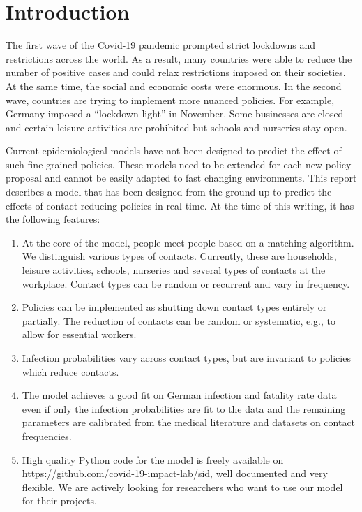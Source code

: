\section{Introduction}
\label{sec:introduction}


The first wave of the Covid-19 pandemic prompted strict lockdowns and restrictions across the world. As a result, many countries were able to reduce the number of positive cases and could relax restrictions imposed on their societies. At the same time, the social and economic costs were enormous. In the second wave, countries are trying to implement more nuanced policies. For example, Germany imposed a ``lockdown-light'' in November. Some businesses are closed and certain leisure activities are prohibited but schools and nurseries stay open.

Current epidemiological models have not been designed to predict the effect of such fine-grained policies. These models need to be extended for each new policy proposal and cannot be easily adapted to fast changing environments. This report describes a model that has been designed from the ground up to predict the effects of contact reducing policies in real time. At the time of this writing, it has the following features:

\begin{enumerate}
    \item At the core of the model, people meet people based on a matching algorithm. We distinguish various types of contacts. Currently, these are households, leisure activities, schools, nurseries and several types of contacts at the workplace. Contact types can be random or recurrent and vary in frequency.
    \item Policies can be implemented as shutting down contact types entirely or partially. The reduction of contacts can be random or systematic, e.g., to allow for essential workers.
    \item Infection probabilities vary across contact types, but are invariant to policies which reduce contacts.
    \item The model achieves a good fit on German infection and fatality rate data even if only the infection probabilities are fit to the data and the remaining parameters are calibrated from the medical literature and datasets on contact frequencies.
    \item High quality Python code for the model is freely available on \href{https://github.com/covid-19-impact-lab/sid}{https://github.com/covid-19-impact-lab/sid}, well documented and very flexible. We are actively looking for researchers who want to use our model for their projects.
\end{enumerate}

